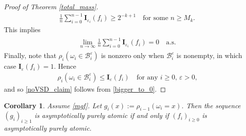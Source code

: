 \documentclass[11pt,reqno]{amsart}
\numberwithin{equation}{section}
\newtheorem{cor}[thm]{Corollary}
\theoremstyle{definition}
\begin{document}
\begin{proof}[Proof of Theorem \ref{total_mass}]
{\begin{align*} {
\frac{1}{n} \sum_{i = 0}^{n-1} {{\boldsymbol {I}}}_{{\varepsilon}_i}(f_i) \geq 2^{-k+1} \quad \text{for some $n \geq M_k$.}
} \end{align*}}
This implies
{\begin{align} \begin{split} {
\lim_{n \to \infty} \frac{1}{n} \sum_{i = 0}^{n-1} {{\boldsymbol {I}}}_{{\varepsilon}_i}(f_i) = 0 \quad \mathrm{a.s.} \label{bigger_to_0}
} \end{split} \end{align}}
Finally, note that $\rho_i(\omega_i \in {\mathcal{B}}_i^{\varepsilon})$ is nonzero only when ${\mathcal{B}}_i^{\varepsilon}$ is nonempty, in which case ${{\boldsymbol {I}}}_{\varepsilon}(f_i) = 1$.
Hence
{\begin{align*} {
\rho_i(\omega_i \in {\mathcal{B}}_i^{\varepsilon}) \leq {{\boldsymbol {I}}}_{\varepsilon} (f_i) \quad \text{for any $i \geq 0$, ${\varepsilon} > 0$,}
} \end{align*}}
and so \eqref{noVSD_claim} follows from \eqref{bigger_to_0}.
\end{proof}

\begin{cor} \label{apa_either_way}
Assume \eqref{mgf}. Let $g_i(x) := \rho_{i-1}(\omega_i =x)$. 
Then the sequence $(g_i)_{i \geq 1}$ is asymptotically purely atomic if and only if $(f_i)_{i \geq 0}$ is asymptotically purely atomic.
\end{cor}
\end{document}
